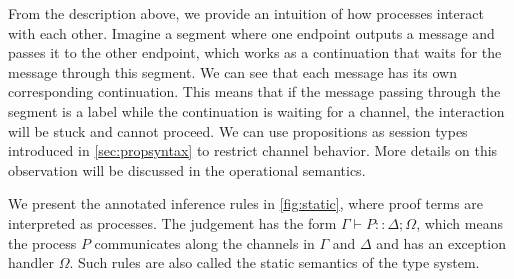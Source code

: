 \documentclass[12pt, openany]{memoir}
\newcommand*{\judge}[4]{#1 \vdash #2 :: #3; #4}
\begin{document}
From the description above, we provide an intuition of how processes interact with each other. 
Imagine a segment where one endpoint outputs a message and passes it to the other endpoint, 
which works as a continuation that waits for the message through this segment. 
We can see that each message has its own corresponding continuation. 
This means that if the message passing through the segment is a label while the continuation is waiting for a channel, 
the interaction will be stuck and cannot proceed. 
We can use propositions as session types introduced in \cref{sec:propsyntax} to restrict channel behavior. 
More details on this observation will be discussed in the operational semantics.

We present the annotated inference rules in \cref{fig:static}, where proof terms are interpreted as processes.
The judgement has the form $\judge{\Gamma}{P}{\Delta}{\Omega}$, 
which means the process $P$ communicates along the channels in $\Gamma$ and $\Delta$ and has an exception handler $\Omega$.
Such rules are also called the static semantics of the type system.
\end{document}
